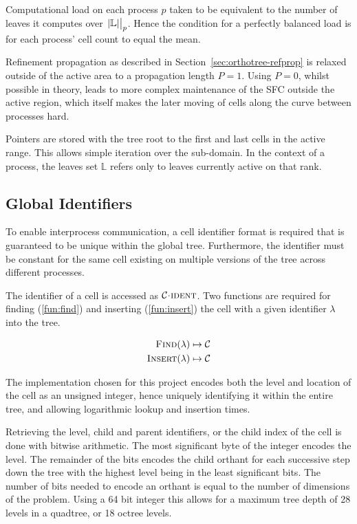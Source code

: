 \documentclass[twoside]{IIBproject}
\newcommand{\acc}{{\mkern 0.5mu\cdot\mkern 0.5mu}}
\numberwithin{figure}{section}
\begin{document}
        Computational load on each process $p$ taken to be equivalent to the number of leaves it computes over $\eval{\abs{\mathbb{L}}}_p$. Hence the condition for a perfectly balanced load is for each process' cell count to equal the mean.

        Refinement propagation as described in Section~\ref{sec:orthotree-refprop} is relaxed outside of the active area to a propagation length $P=1$. Using $P=0$, whilst possible in theory, leads to more complex maintenance of the SFC outside the active region, which itself makes the later moving of cells along the curve between processes hard. 

        Pointers are stored with the tree root to the first and last cells in the active range. This allows simple iteration over the sub-domain. In the context of a process, the leaves set $\mathbb{L}$ refers only to leaves currently active on that rank.



    \subsection{Global Identifiers} %
        \label{sec:globalid}

        To enable interprocess communication, a cell identifier format is required that is guaranteed to be unique within the global tree. Furthermore, the identifier must be constant for the same cell existing on multiple versions of the tree across different processes.

        The identifier of a cell is accessed as $\mathcal{C}\acc\textproc{ident}$. Two functions are required for finding (\ref{fun:find}) and inserting (\ref{fun:insert}) the cell with a given identifier $\lambda$ into the tree.

        \begin{align}
            \label{fun:find}
            \textproc{Find}(\lambda) \mapsto \mathcal{C} \\
            \label{fun:insert}
            \textproc{Insert}(\lambda) \mapsto \mathcal{C}
        \end{align}

        The implementation chosen for this project encodes both the level and location of the cell as an unsigned integer, hence uniquely identifying it within the entire tree, and allowing logarithmic lookup and insertion times.

        Retrieving the level, child and parent identifiers, or the child index of the cell is done with bitwise arithmetic. The most significant byte of the integer encodes the level. The remainder of the bits encodes the child orthant for each successive step down the tree with the highest level being in the least significant bits. The number of bits needed to encode an orthant is equal to the number of dimensions of the problem. Using a 64 bit integer this allows for a maximum tree depth of 28 levels in a quadtree, or 18 octree levels.
\end{document}
